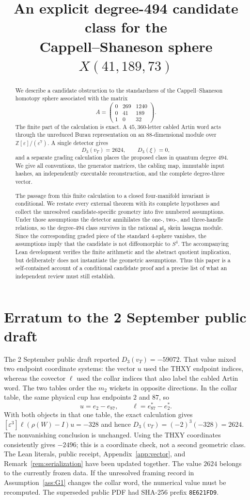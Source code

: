 \documentclass[10pt,reqno]{amsart}
\title[An explicit degree-494 candidate class]{An explicit degree-494 candidate class for the\\
Cappell--Shaneson sphere $X(41,189,73)$}
\date{}
\theoremstyle{definition}
\theoremstyle{remark}
\newcommand{\Z}{\mathbb Z}
\newcommand{\eps}{\varepsilon}
\begin{document}
\begin{abstract}
We describe a candidate obstruction to the standardness of the
Cappell--Shaneson homotopy sphere associated with the matrix
\[
  A=\begin{pmatrix}0&269&1240\\0&41&189\\1&0&32\end{pmatrix}.
\]
The finite part of the calculation is exact.  A $45{,}360$-letter cabled
Artin word acts through the unreduced Burau representation on an
$88$-dimensional module over $\Z[\eps]/(\eps^7)$.  A single detector gives
\[
  D_3(v_T)=2624,\qquad D_3(\xi)=0,
\]
and a separate grading calculation places the proposed class in quantum
degree $494$.  We give all conventions, the generator matrices, the cabling
map, immutable input hashes, an independently executable reconstruction, and
the complete degree-three vector.

The passage from this finite calculation to a closed four-manifold invariant
is conditional.  We restate every external theorem with its complete
hypotheses and collect the unresolved candidate-specific geometry into five
numbered assumptions.  Under those assumptions the detector annihilates the one-, two-, and three-handle
relations, so the degree-$494$ class survives in the rational
$\mathfrak{sl}_2$ skein lasagna module.  Since the corresponding graded piece
of the standard $4$-sphere vanishes, the assumptions imply that the candidate
is not diffeomorphic to $S^4$.  The accompanying Lean development verifies
the finite arithmetic and the abstract quotient implication, but deliberately
does not instantiate the geometric assumptions.  Thus this paper is a
self-contained account of a conditional candidate proof and a precise list of
what an independent review must still establish.
\end{abstract}

\section*{Erratum to the 2 September public draft}

The 2 September public draft reported $D_3(v_T)=-59072$.  That value mixed
two endpoint coordinate systems: the vector $u$ used the THXY endpoint
indices, whereas the covector $\ell$ used the collar indices that also label
the cabled Artin word.  The two tables order the $m_2$ wickets in opposite
directions.  In the collar table, the same physical cup has endpoints $2$
and $87$, so
\[
  u=e_2-e_{87},\qquad \ell=e_{87}^*-e_2^*.
\]
With both objects in that one table, the exact calculation gives
$[\varepsilon^3]\ell(\rho(W)-I)u=-328$ and hence
$D_3(v_T)=(-2)^3(-328)=2624$.  The nonvanishing conclusion is unchanged.
Using the THXY coordinates consistently gives $-2496$; this is a coordinate
check, not a second geometric class.  The Lean literals, public receipt,
Appendix~\ref{app:vector}, and Remark~\ref{rem:serialization} have been
updated together.  The value $2624$ belongs to the currently frozen data.  If
the unresolved framing record in Assumption~\ref{ass:G1} changes the collar
word, the numerical value must be recomputed.  The superseded public PDF had
SHA-256 prefix \texttt{8E621FD9}.
\end{document}
